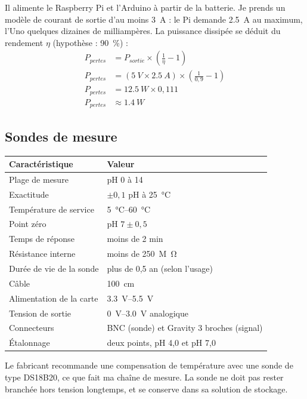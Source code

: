 \noindent Il alimente le Raspberry Pi et l'Arduino à partir de la batterie. Je prends un modèle de courant de sortie d'au moins \qty{3}{A} : le Pi demande \qty{2,5}{A} au maximum, l'Uno quelques dizaines de milliampères. La puissance dissipée se déduit du rendement $\eta$ (hypothèse : \qty{90}{\percent}) :
\begin{align*}
P_{pertes} &= P_{sortie} \times \left(\frac{1}{\eta} - 1\right)\\
P_{pertes} &= (\qty{5}{V} \times \qty{2,5}{A}) \times \left(\frac{1}{0,9} - 1\right)\\
P_{pertes} &= \qty{12,5}{W} \times 0,111\\
P_{pertes} &\approx \qty{1,4}{W}
\end{align*}

\subsection*{Sondes de mesure}

\noindent
\begin{table}[H]
\centering
\begin{tabularx}{\linewidth}{lY}
\hline
Caractéristique & Valeur \\
\hline
Plage de mesure & pH 0 à 14 \\
Exactitude & $\pm0,1$ pH à \qty{25}{\celsius} \\
Température de service & \qtyrange{5}{60}{\celsius} \\
Point zéro & pH $7 \pm 0,5$ \\
Temps de réponse & moins de 2 min \\
Résistance interne & moins de \qty{250}{M\ohm} \\
Durée de vie de la sonde & plus de 0,5 an (selon l'usage) \\
Câble & \qty{100}{cm} \\
Alimentation de la carte & \qtyrange{3,3}{5,5}{V} \\
Tension de sortie & \qtyrange{0}{3,0}{V} analogique \\
Connecteurs & BNC (sonde) et Gravity 3 broches (signal) \\
Étalonnage & deux points, pH 4,0 et pH 7,0 \\
\hline
\end{tabularx}
\end{table}
Le fabricant recommande une compensation de température avec une sonde de type DS18B20, ce que fait ma chaîne de mesure. La sonde ne doit pas rester branchée hors tension longtemps, et se conserve dans sa solution de stockage.

